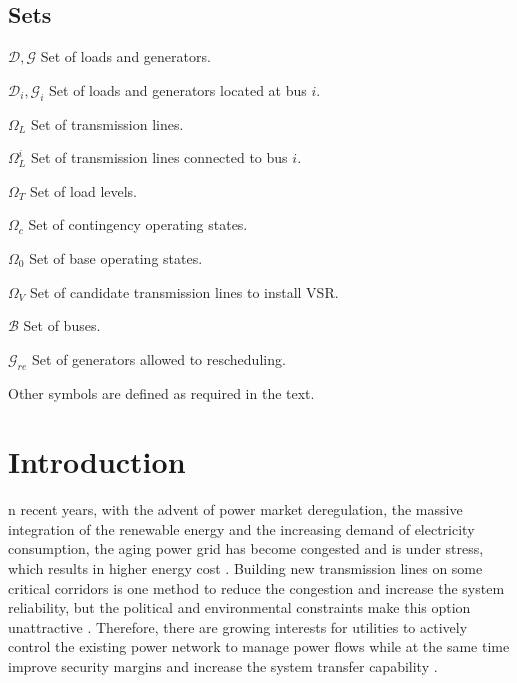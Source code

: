 \documentclass[journal]{IEEEtran}
\begin{document}
\subsection*{Sets}
\begin{IEEEdescription}
	\item[$\mathcal{D},\mathcal{G}$] Set of loads and generators.
	\item[$\mathcal{D}_i,\mathcal{G}_{i}$] Set of loads and generators located at bus $i$.
	\item[$\Omega_{L}$] Set of transmission lines.
	\item[$\Omega_{L}^i$] Set of transmission lines connected to bus $i$.
	\item[$\Omega_{T}$] Set of load levels.
	\item[$\Omega_{c}$] Set of contingency operating states.
	\item[$\Omega_{0}$] Set of base operating states.
	\item[$\Omega_{V}$] Set of candidate transmission lines to install VSR.
	\item[$\mathcal{B}$] Set of buses. 
	\item[$\mathcal{G}_{re}$] Set of generators allowed to rescheduling.
\end{IEEEdescription}
Other symbols are defined as required in the text.




\section{Introduction}
n recent years, with the advent of power market deregulation, the massive integration of the renewable energy and the increasing demand of electricity consumption, the aging power grid has become congested and is under stress, which results in higher energy cost \cite{mybibb:ps_economics,mybibb:national_grid}. Building new transmission lines on some critical corridors is one method to reduce the congestion and increase the system reliability, but the political and environmental constraints make this option unattractive \cite{mybibb:tep_pst_myself}. Therefore, there are growing interests for utilities to actively control the existing power network to manage power flows while at the same time improve security margins and increase the system transfer capability    
\cite{mybibb:optfacts,mybibb:GAFACTS}.
\end{document}
